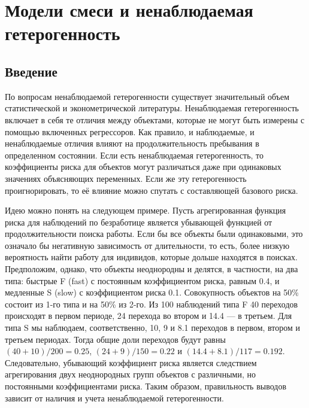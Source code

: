 
\chapter{Модели смеси и ненаблюдаемая гетерогенность}

%


\section{Введение}\label{sec:18.1}

\noindent
По вопросам ненаблюдаемой гетерогенности существует значительный объем статистической и эконометрической литературы. Ненаблюдаемая гетерогенность включает в себя те отличия между объектами, которые не могут быть измерены с помощью включенных регрессоров. Как правило, и наблюдаемые, и ненаблюдаемые отличия влияют на продолжительность пребывания в определенном состоянии. Если есть ненаблюдаемая гетерогенность, то коэффициенты риска для объектов могут различаться даже при одинаковых значениях объясняющих переменных. Если же эту гетерогенность проигнорировать, то её влияние можно спутать с составляющей базового риска.

Идею можно понять на следующем примере. Пусть агрегированная функция риска для наблюдений по безработице является убывающей функцией от продолжительности поиска работы. Если бы все объекты были одинаковыми, это означало бы негативную зависимость от длительности, то есть, более низкую вероятность найти работу для индивидов, которые дольше находятся в поисках. Предположим, однако, что объекты неоднородны и делятся, в частности, на два типа: быстрые F (fast) с постоянным коэффициентом риска, равным 0.4, и медленные S (slow) с коэффициентом риска 0.1. Совокупность объектов на 50\% состоит из 1-го типа и на 50\% из 2-го. Из 100 наблюдений типа F 40 переходов происходят в первом периоде, 24 перехода во втором и 14.4 --- в третьем. Для типа S мы наблюдаем, соответственно, 10, 9 и 8.1 переходов в первом, втором и третьем периодах. Тогда общие доли переходов будут равны $(40 + 10) / 200 = 0.25$, $(24 + 9) / 150 = 0.22$ и $(14.4 + 8.1) / 117 = 0.192$. Следовательно, убывающий коэффициент риска является следствием агрегирования двух неоднородных групп объектов с различными, но постоянными коэффициентами риска. Таким образом, правильность выводов зависит от наличия и учета ненаблюдаемой гетерогенности.

